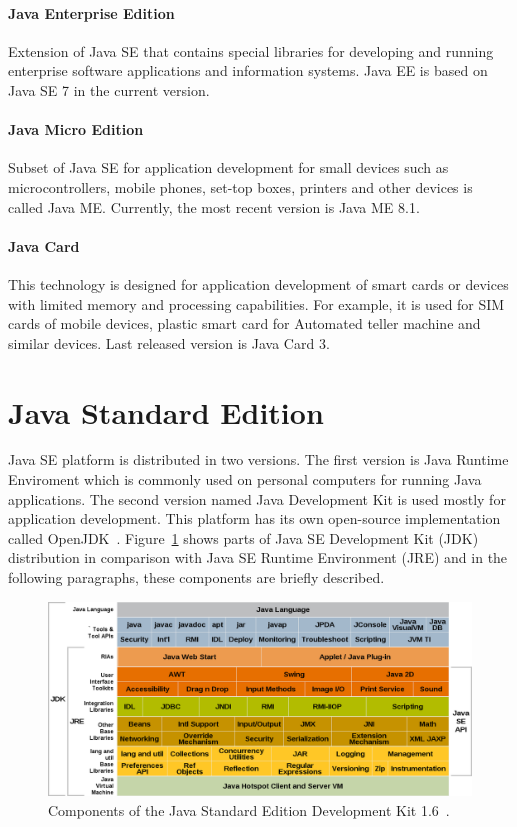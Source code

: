 \paragraph{Java Enterprise Edition}
Extension of Java SE that contains special libraries for developing and running enterprise software applications and
information systems. Java EE is based on Java SE 7 in the current version.

\paragraph{Java Micro Edition}
Subset of Java SE for application development for small devices such as microcontrollers, mobile phones, set-top boxes,
printers and other devices is called Java ME. Currently, the most recent version is Java ME 8.1.

\paragraph{Java Card}
This technology is designed for application development of smart cards or devices with limited memory and processing
capabilities. For example, it is used for SIM cards of mobile devices, plastic smart card for Automated teller machine
and similar devices. Last released version is Java Card 3.

\section{Java Standard Edition}\label{JavaSESection}
Java SE platform is distributed in two versions. The first version is Java Runtime Enviroment which is commonly used on
personal computers for running Java applications. The second version named Java Development Kit is used mostly for
application development. This platform has its own open-source implementation called OpenJDK~\cite{OpenJDK}.
Figure~\ref{JavaComponentsFigure} shows parts of Java SE Development Kit (JDK) distribution in comparison with Java SE
Runtime Environment (JRE) and in the following paragraphs, these components are briefly described.
\\
\begin{figure}[h!]
    \centering
    \includegraphics[scale=0.35]{fig/java_6_jdk.png}
    \caption{Components of the Java Standard Edition Development Kit 1.6~\cite{Java6Doc}.}
    \label{JavaComponentsFigure}
\end{figure}

